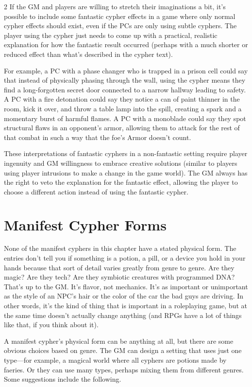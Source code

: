 \begin{multicols}{2}
If the GM and players are willing to stretch their imaginations a bit, it’s possible to include some fantastic cypher effects in a game where only normal cypher effects should exist, even if the PCs are only using subtle cyphers. The player using the cypher just needs to come up with a practical, realistic explanation for how the fantastic result occurred (perhaps with a much shorter or reduced effect than what’s described in the cypher text). 

For example, a PC with a phase changer who is trapped in a prison cell could say that instead of physically phasing through the wall, using the cypher means they find a long-forgotten secret door connected to a narrow hallway leading to safety. A PC with a fire detonation could say they notice a can of paint thinner in the room, kick it over, and throw a table lamp into the spill, creating a spark and a momentary burst of harmful flames. A PC with a monoblade could say they spot structural flaws in an opponent’s armor, allowing them to attack for the rest of that combat in such a way that the foe’s Armor doesn’t count.

These interpretations of fantastic cyphers in a non-fantastic setting require player ingenuity and GM willingness to embrace creative solutions (similar to players using player intrusions to make a change in the game world). The GM always has the right to veto the explanation for the fantastic effect, allowing the player to choose a different action instead of using the fantastic cypher.

\section{Manifest Cypher Forms}

None of the manifest cyphers in this chapter have a stated physical form. The entries don’t tell you if something is a potion, a pill, or a device you hold in your hands because that sort of detail varies greatly from genre to genre. Are they magic? Are they tech? Are they symbiotic creatures with programmed DNA? That’s up to the GM. It’s flavor, not mechanics. It’s as important or unimportant as the style of an NPC’s hair or the color of the car the bad guys are driving. In other words, it’s the kind of thing that is important in a roleplaying game, but at the same time doesn’t actually change anything (and RPGs have a lot of things like that, if you think about it).

A manifest cypher’s physical form can be anything at all, but there are some obvious choices based on genre. The GM can design a setting that uses just one type—for example, a magical world where all cyphers are potions made by faeries. Or they can use many types, perhaps mixing them from different genres. Some suggestions include the following.


\end{multicols}
